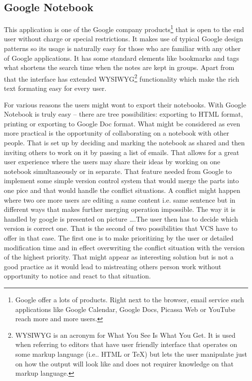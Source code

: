 \subsection{Google Notebook}\label{subsec:google_notebook}
This application is one of the Google company products\footnote{Google offer a lots of products. Right next to the browser, email service such applications like Google Calendar, Google Docs, Picassa Web or YouTube reach more and more users.} that is open to the end user without charge or special restrictions. It makes use of typical Google design patterns so its usage is naturally easy for those who are familiar with any other of Google applications. It has some standard elements like bookmarks and tags what shortens the search time when the notes are kept in groups. Apart from that the interface has extended WYSIWYG\footnote{WYSIWYG is an acronym for What You See Is What You Get. It is used when referring to editors that have user friendly interface that operates on some markup language (i.e.. HTML or \TeX) but lets the user manipulate just on how the output will look like and does not requirer knowledge on that markup language.} functionality which make the rich text formating easy for every user.

For various reasons the users might wont to export their notebooks. With Google Notebook is truly easy -- there are tree possibilities: exporting to HTML format, printing or exporting to Google Doc format. What might be considered as even more practical is the opportunity of collaborating on a notebook with other people. That is set up by deciding and marking the notebook as shared and then inviting others to work on it by passing a list of emails. That allows for a great user experience where the users may share their ideas by working on one notebook simultaneously or in separate. That feature needed from Google to implement some simple version control system that would merge the parts into one pice and that would handle the conflict situations. A conflict might happen where two ore more users are editing a same content i.e. same sentence but in different ways that makes further merging operation impossible. The way it is handled by google is presented on picture \dots .The user then has to decide which version is correct one. That is the second of two possibilities that VCS have to offer in that case. The first one is to make prioritizing by the user or detailed modification time and in effect overwriting the conflict situation with the version of the highest priority. That might appear as interesting solution but is not a good practice as it would lead to mistreating others person work without opportunity to notice and react to that situation.


